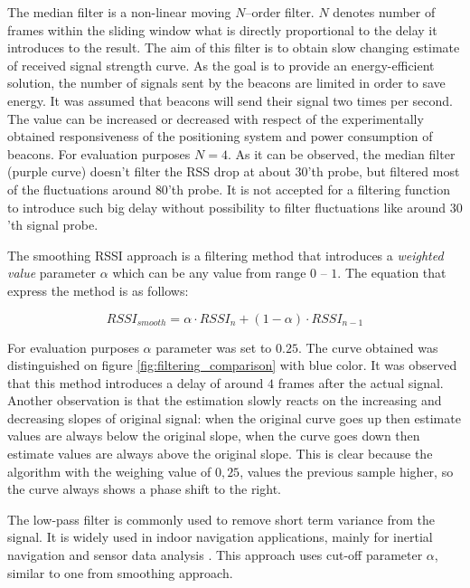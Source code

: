 \documentclass[../main.tex]{subfiles}
\begin{document}
The median filter is a non-linear moving $N$--order filter. $N$ denotes number of frames within the sliding window what is directly proportional to the delay it introduces to the result. The aim of this filter is to obtain slow changing estimate of received signal strength curve. As the goal is to provide an energy-efficient solution, the number of signals sent by the beacons are limited in order to save energy. It was assumed that beacons will send their signal two times per second. The value can be increased or decreased with respect of the experimentally obtained responsiveness of the positioning system and power consumption of beacons. For evaluation purposes $N=4$. As it can be observed, the median filter (purple curve) doesn't filter the RSS drop at about $30$'th probe, but filtered most of the fluctuations around $80$'th probe. It is not accepted for a filtering function to introduce such big delay without possibility to filter fluctuations like around $30$'th signal probe.

The smoothing RSSI approach \cite{rssi_smoothing} is a filtering method that introduces a \textit{weighted value} parameter $\alpha$ which can be any value from range $0$ -- $1$. The equation that express the method is as follows:

\begin{equation}
\label{eq:rssi_smoothing}
	RSSI_{smooth} = \alpha \cdot RSSI_n + (1 - \alpha) \cdot RSSI_{n-1}
\end{equation}

For evaluation purposes $\alpha$ parameter was set to $0.25$. The curve obtained was distinguished on figure \ref{fig:filtering_comparison} with blue color. It was observed that this method introduces a delay of around $4$ frames after the actual signal. Another observation is that the estimation slowly reacts on the increasing and decreasing slopes of original signal: when the original curve goes up then estimate values are always below the original slope, when the curve goes down then estimate values are always above the original slope. This is clear because the algorithm with the weighing value of $0,25$, values the previous sample higher, so the curve always shows a phase shift to the right.

The low-pass filter is commonly used to remove short term variance from the signal. It is widely used in indoor navigation applications, mainly for inertial navigation and sensor data analysis \cite{indoor_positioning_for_ar}\cite{indoor_navi_for_android2}\cite{report_indoor_navi_for_smartphones}\cite{thesis_ins_algorithms_for_android}\cite{indoor_positioning_for_ar_PhD_GOOD}. This approach uses cut-off parameter $\alpha$, similar to one from smoothing approach.
\end{document}
